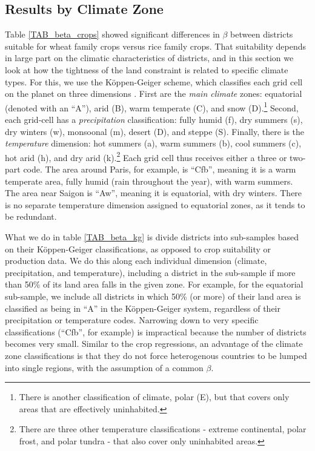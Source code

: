 \documentclass[11pt]{article}
\begin{document}
\subsection{Results by Climate Zone}
Table \ref{TAB_beta_crops} showed significant differences in $\beta$ between districts suitable for wheat family crops versus rice family crops. That suitability depends in large part on the climatic characteristics of districts, and in this section we look at how the tightness of the land constraint is related to specific climate types. For this, we use the K{\"o}ppen-Geiger scheme, which classifies each grid cell on the planet on three dimensions \citep{kottek2006}. First are the \textit{main climate} zones: equatorial (denoted with an ``A''), arid (B), warm temperate (C), and snow (D).\footnote{There is another classification of climate, polar (E), but that covers only areas that are effectively uninhabited.} Second, each grid-cell has a \textit{precipitation} classification: fully humid (f), dry summers (s), dry winters (w), monsoonal (m), desert (D), and steppe (S). Finally, there is the \textit{temperature} dimension: hot summers (a), warm summers (b), cool summers (c), hot arid (h), and dry arid (k).\footnote{There are three other temperature classifications - extreme continental, polar frost, and polar tundra - that also cover only uninhabited areas.} Each grid cell thus receives either a three or two-part code. The area around Paris, for example, is ``Cfb'', meaning it is a warm temperate area, fully humid (rain throughout the year), with warm summers. The area near Saigon is ``Aw'', meaning it is equatorial, with dry winters. There is no separate temperature dimension assigned to equatorial zones, as it tends to be redundant.

What we do in table \ref{TAB_beta_kg} is divide districts into sub-samples based on their K{\"o}ppen-Geiger classifications, as opposed to crop suitability or production data. We do this along each individual dimension (climate, precipitation, and temperature), including a district in the sub-sample if more than 50\% of its land area falls in the given zone. For example, for the equatorial sub-sample, we include all districts in which 50\% (or more) of their land area is classified as being in ``A'' in the K{\"o}ppen-Geiger system, regardless of their precipitation or temperature codes. Narrowing down to very specific classifications (``Cfb'', for example) is impractical because the number of districts becomes very small. Similar to the crop regressions, an advantage of the climate zone classifications is that they do not force heterogenous countries to be lumped into single regions, with the assumption of a common $\beta$. 
\end{document}
